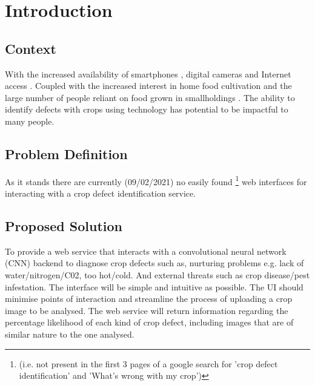 \chapter{Introduction}
\label{introduction}

\section{Context}
  With the increased availability of smartphones \cite{Statista}, digital cameras \cite{ImarcGroup} and Internet access \cite{Wikipedia} \cite{Globaltt}. Coupled with the increased interest in home food cultivation \cite{Google} and the large number of people reliant on food grown in smallholdings \cite{JLIFADSmallHolders}. The ability to identify defects with crops using technology has potential to be impactful to many people.
\section{Problem Definition}
  As it stands there are currently (09/02/2021) no easily found \footnote[1]{(i.e. not present in the first 3 pages of a google search for 'crop defect identification' and 'What's wrong with my crop')} web interfaces for interacting with a crop defect identification service.
\section{Proposed Solution}
  To provide a web service that interacts with a convolutional neural network (CNN) backend to diagnose crop defects such as, nurturing problems e.g. lack of water/nitrogen/C02, too hot/cold. And external threats such as crop disease/pest infestation. The interface will be simple and intuitive as possible. The UI should minimise points of interaction and streamline the process of uploading a crop image to be analysed.
	The web service will return information regarding the percentage likelihood of each kind of crop defect, including images that are of similar nature to the one analysed.

